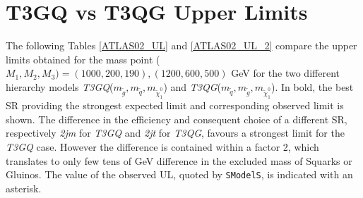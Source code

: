 \documentclass[preprint,number,sort&compress,twocolumn,3p]{elsstyarticle}
\newcommand{\SMO}{\texttt{SModelS\xspace}}
\begin{document}
\section{T3GQ vs T3QG Upper Limits}\label{app:ul}
The following Tables \ref{ATLAS02_UL} and \ref{ATLAS02_UL_2}  compare the upper limits obtained for the mass point ($M_1,M_2,M_3) = (1000,200,190),(1200,600,500)$ GeV for the two different hierarchy models \textit{T3GQ}($m_{\tilde g}, m_{\tilde q}, m_{\tilde \chi _1 ^0 }$) and \textit{T3QG}($m_{\tilde q}, m_{\tilde g}, m_{\tilde \chi _1 ^0 }$). In bold, the best SR providing the strongest expected limit and corresponding observed limit is shown. The difference in the efficiency and consequent choice of a different SR, respectively \textit{2jm} for \textit{T3GQ} and \textit{2jt} for \textit{T3QG}, favours a strongest limit for the \textit{T3GQ} case. However the difference is contained within a factor 2, which translates to only few tens of GeV difference in the excluded mass of Squarks or Gluinos. The value of the observed UL, quoted by \SMO, is indicated with an asterisk. 
\end{document}
